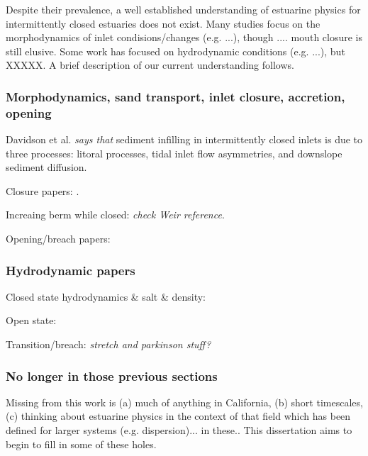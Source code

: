 Despite their prevalence, a well established understanding of estuarine physics for intermittently closed estuaries does not exist. Many studies focus on the morphodynamics of inlet condisions/changes (e.g. ...), though .... mouth closure is still elusive. Some work has focused on hydrodynamic conditions (e.g. ...), but XXXXX. A brief description of our current understanding follows.

\subsubsection{Morphodynamics, sand transport, inlet closure, accretion, opening}
Davidson et al. \cite{davidson_simple_2009} \emph{says that} sediment infilling in intermittently closed inlets is due to three processes: litoral processes, tidal inlet flow asymmetries, and downslope sediment diffusion.

Closure papers: \cite{ranasinghe_seasonal_2003, elwany_opening_1998, fortunato_morphological_2014, hanes_waves_2011, behrens_characterization_2009, behrens_episodic_2013}.

Increaing berm while closed: \cite{baldock_morphodynamic_2008, laudier_measured_2011, weir_beach_2006} \emph{check Weir reference}. 

Opening/breach papers: \cite{rich_hydrologic_2013, parkinson_breaching_2007, stretch_breaching_2006, elwany_opening_1998, fortunato_morphological_2014}

\subsubsection{Hydrodynamic papers}
Closed state hydrodynamics \& salt \& density: \cite{cousins_hydrodynamics_2011, slinger_evolution_1990}

Open state: \cite{largier_dynamics_1991}

Transition/breach: \cite{becker_artificial_2009}  \emph{stretch and parkinson stuff?}

\subsubsection{No longer in those previous sections}

Missing from this work is (a) much of anything in California, (b) short timescales, (c) thinking about estuarine physics in the context of that field which has been defined for larger systems (e.g. dispersion)... in these.. This dissertation aims to begin to fill in some of these holes. 

